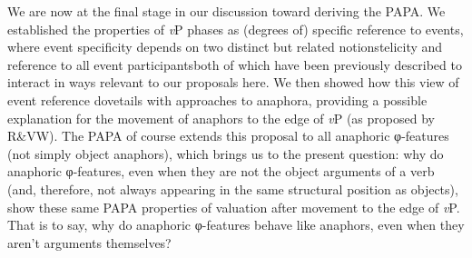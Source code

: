 We are now at the final stage in our discussion toward deriving the PAPA. We established the properties of \textit{v}P phases as (degrees of) specific reference to events, where event specificity depends on two distinct but related notions\textemdash telicity and reference to all event participants\textemdash both of which have been previously described to interact in ways relevant to our proposals here. We then showed how this view of event reference dovetails with approaches to anaphora, providing a possible explanation for the movement of anaphors to the edge of \textit{v}P (as proposed by R\&VW). The PAPA of course extends this proposal to all anaphoric φ-features (not simply object anaphors), which brings us to the present question: why do anaphoric φ-features, even when they are not the object arguments of a verb (and, therefore, not always appearing in the same structural position as objects), show these same PAPA properties of valuation after movement to the edge of \textit{v}P.  That is to say, why do anaphoric φ-features behave like anaphors, even when they aren’t arguments themselves?

